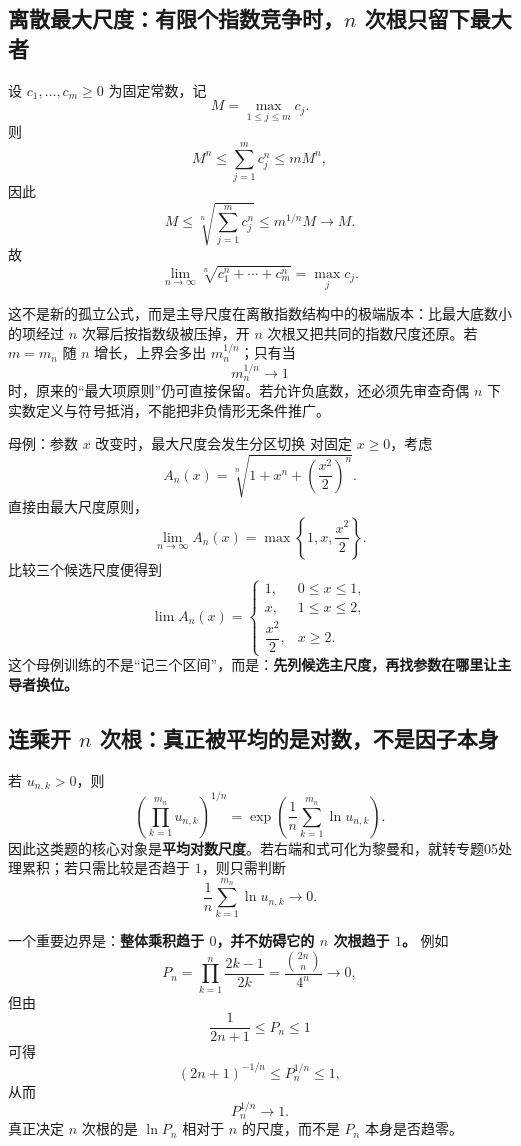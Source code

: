 \documentclass[11pt,a4paper]{ctexart}
\newcommand{\kw}[1]{\textbf{\color{deep}#1}}
\begin{document}
\subsection{离散最大尺度：有限个指数竞争时，$n$ 次根只留下最大者}

设 $c_1,\dots,c_m\ge0$ 为固定常数，记
\[
M=\max_{1\le j\le m}c_j.
\]
则
\[
M^n\le \sum_{j=1}^m c_j^n\le mM^n,
\]
因此
\[
M\le \sqrt[n]{\sum_{j=1}^m c_j^n}\le m^{1/n}M\to M.
\]
故
\[
\boxed{\lim_{n\to\infty}\sqrt[n]{c_1^n+\cdots+c_m^n}=\max_j c_j.}
\]

这不是新的孤立公式，而是主导尺度在离散指数结构中的极端版本：比最大底数小的项经过 $n$ 次幂后按指数级被压掉，开 $n$ 次根又把共同的指数尺度还原。若 $m=m_n$ 随 $n$ 增长，上界会多出 $m_n^{1/n}$；只有当
\[
m_n^{1/n}\to1
\]
时，原来的“最大项原则”仍可直接保留。若允许负底数，还必须先审查奇偶 $n$ 下实数定义与符号抵消，不能把非负情形无条件推广。

\begin{corebox}{母例：参数 $x$ 改变时，最大尺度会发生分区切换}
对固定 $x\ge0$，考虑
\[
A_n(x)=\sqrt[n]{1+x^n+\left(\frac{x^2}{2}\right)^n}.
\]
直接由最大尺度原则，
\[
\lim_{n\to\infty}A_n(x)=\max\left\{1,x,\frac{x^2}{2}\right\}.
\]
比较三个候选尺度便得到
\[
\lim A_n(x)=
\begin{cases}
1,&0\le x\le1,\\
x,&1\le x\le2,\\
\dfrac{x^2}{2},&x\ge2.
\end{cases}
\]
这个母例训练的不是“记三个区间”，而是：\textbf{先列候选主尺度，再找参数在哪里让主导者换位。}
\end{corebox}

\subsection{连乘开 $n$ 次根：真正被平均的是对数，不是因子本身}

若 $u_{n,k}>0$，则
\[
\left(\prod_{k=1}^{m_n}u_{n,k}\right)^{1/n}
=
\exp\left(\frac1n\sum_{k=1}^{m_n}\ln u_{n,k}\right).
\]
因此这类题的核心对象是\kw{平均对数尺度}。若右端和式可化为黎曼和，就转专题05处理累积；若只需比较是否趋于 $1$，则只需判断
\[
\frac1n\sum_{k=1}^{m_n}\ln u_{n,k}\to0.
\]

一个重要边界是：\textbf{整体乘积趋于 $0$，并不妨碍它的 $n$ 次根趋于 $1$。} 例如
\[
P_n=\prod_{k=1}^n\frac{2k-1}{2k}
=\frac{\binom{2n}{n}}{4^n}\to0,
\]
但由
\[
\frac1{2n+1}\le P_n\le1
\]
可得
\[
(2n+1)^{-1/n}\le P_n^{1/n}\le1,
\]
从而
\[
P_n^{1/n}\to1.
\]
真正决定 $n$ 次根的是 $\ln P_n$ 相对于 $n$ 的尺度，而不是 $P_n$ 本身是否趋零。
\end{document}
